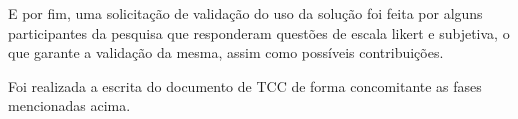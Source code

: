 E por fim, uma solicitação de validação do uso da solução foi feita por alguns participantes da pesquisa que responderam questões de escala likert e subjetiva, o que garante a validação da mesma, assim como possíveis contribuições.

Foi realizada a escrita do documento de TCC de forma concomitante as fases mencionadas acima.